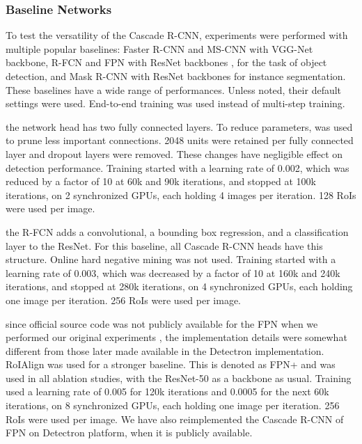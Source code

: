 \documentclass[10pt,journal,compsoc]{IEEEtran}
\begin{document}
\subsubsection{Baseline Networks}
\label{subsubsec:baseline}

To test the versatility of the Cascade R-CNN, experiments were performed with
multiple popular baselines: Faster R-CNN and
MS-CNN \cite{DBLP:conf/eccv/CaiFFV16} with VGG-Net \cite{DBLP:journals/corr/SimonyanZ14a} backbone,
R-FCN \cite{DBLP:conf/nips/DaiLHS16} and FPN \cite{lin2017feature} with
ResNet backbones \cite{DBLP:conf/cvpr/HeZRS16}, for the task of object detection, and Mask R-CNN \cite{he2017mask} with ResNet backbones for instance segmentation.
These baselines have a wide range of performances. Unless noted, their
default settings were used. End-to-end training was used instead of
multi-step training.

\vspace{0.2cm}
the network head has two fully connected layers. To reduce parameters,
\cite{DBLP:conf/nips/HanPTD15} was used to prune less important connections.
2048 units were retained per fully connected layer and dropout layers were
removed. These changes have negligible effect on detection performance.
Training started with a learning rate of 0.002, which was reduced by a factor
of 10 at 60k and 90k iterations, and stopped at 100k iterations, on 2
synchronized GPUs, each holding 4 images per iteration. 128 RoIs were used
per image.

\vspace{0.2cm}
the R-FCN adds a convolutional, a bounding box regression, and a
classification layer to the ResNet. For this baseline, all
Cascade R-CNN heads have this structure. Online hard negative
mining \cite{DBLP:conf/cvpr/ShrivastavaGG16}
was not used. Training started with a learning rate of 0.003, which was
decreased by a factor of 10 at 160k and 240k iterations, and stopped at 280k
iterations, on 4 synchronized GPUs, each holding one image per iteration.
256 RoIs were used per image.


\vspace{0.2cm}
since official source code was not publicly available for the FPN when we
performed our original experiments \cite{cai18cascadercnn},
the implementation details were somewhat different from those later made
available in the Detectron implementation.
RoIAlign \cite{he2017mask} was used for a stronger baseline. This is denoted
as FPN+ and was used in all ablation studies, with the ResNet-50 as a
backbone as usual. Training used a learning rate of 0.005 for 120k iterations and
0.0005 for the next 60k iterations, on 8 synchronized GPUs,
each holding one image per iteration. 256 RoIs were used per image.
We have also reimplemented the Cascade R-CNN of FPN on Detectron platform, when it is
publicly available.
\end{document}
